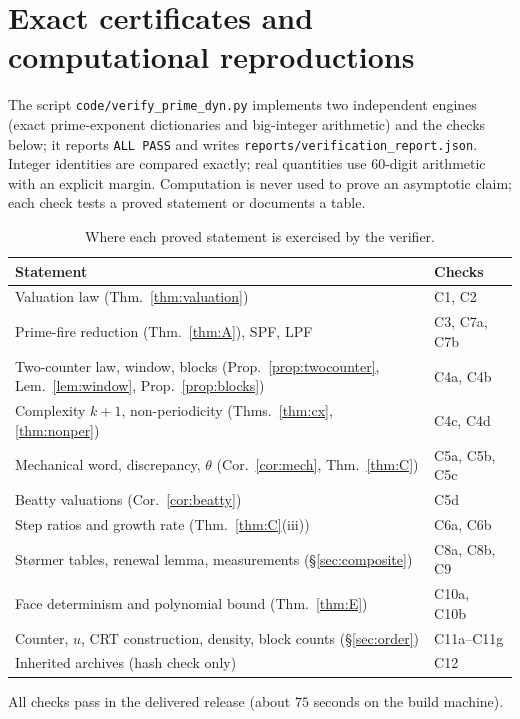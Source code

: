 \section{Exact certificates and computational reproductions}\label{app:checks}
The script \texttt{code/verify\_prime\_dyn.py} implements two independent engines (exact prime-exponent dictionaries and big-integer arithmetic) and the checks below; it reports \texttt{ALL PASS} and writes \texttt{reports/verification\_report.json}. Integer identities are compared exactly; real quantities use $60$-digit arithmetic with an explicit margin. Computation is never used to prove an asymptotic claim; each check tests a proved statement or documents a table.
\begin{table}[ht]\centering\small
\begin{tabular}{@{}ll@{}}\toprule
Statement & Checks\\\midrule
Valuation law (Thm.~\ref{thm:valuation}) & C1, C2\\
Prime-fire reduction (Thm.~\ref{thm:A}), \textsf{SPF}, \textsf{LPF} & C3, C7a, C7b\\
Two-counter law, window, blocks (Prop.~\ref{prop:twocounter}, Lem.~\ref{lem:window}, Prop.~\ref{prop:blocks}) & C4a, C4b\\
Complexity $k+1$, non-periodicity (Thms.~\ref{thm:cx}, \ref{thm:nonper}) & C4c, C4d\\
Mechanical word, discrepancy, $\theta$ (Cor.~\ref{cor:mech}, Thm.~\ref{thm:C}) & C5a, C5b, C5c\\
Beatty valuations (Cor.~\ref{cor:beatty}) & C5d\\
Step ratios and growth rate (Thm.~\ref{thm:C}(iii)) & C6a, C6b\\
Størmer tables, renewal lemma, measurements (§\ref{sec:composite}) & C8a, C8b, C9\\
Face determinism and polynomial bound (Thm.~\ref{thm:E}) & C10a, C10b\\
Counter, $u$, CRT construction, density, block counts (§\ref{sec:order}) & C11a--C11g\\
Inherited archives (hash check only) & C12\\
\bottomrule\end{tabular}
\caption{Where each proved statement is exercised by the verifier.}\label{tab:map}\end{table}
\begin{center}\small\end{center}
All checks pass in the delivered release (about $75$ seconds on the build machine).

